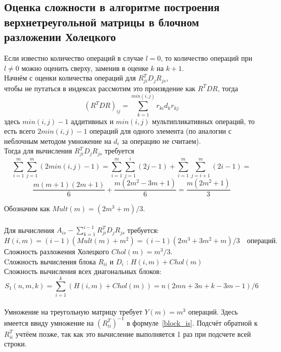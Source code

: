 \documentclass[a4paper,12pt]{article}
\begin{document}
    
\newpage
\subsection{Оценка сложности в алгоритме построения верхнетреугольной 
матрицы в блочном разложении Холецкого}
    Если известно количество операций в случае $l = 0$, то количество 
    операций при $l \neq 0$ можно оценить сверху, заменив в оценке $k$ на $k + 1$.  \\
    
    Начнём с оценки количества операций для $R_{ji}^T D_j R_{js}$,\\
    чтобы не путаться в индексах рассмотим это произвдение как $R^TDR$, тогда
    $$ (R^TDR)_{ij} = \sum_{k=1}^{min(i,j)} r_{ki} d_k r_{kj} $$
    здесь $min(i,j) - 1$ аддитивных и $min(i,j)$ мультипликативных операций, 
    то есть всего $2min(i,j) - 1$ операций для одного элемента 
    (по аналогии с неблочным методом умножение на $d_i$ за операцию не считаем). \\
    
    Тогда для вычисления $R_{ji}^T D_j R_{js}$ требуется 
    $$
        \sum_{i=1}^m \sum_{j=1}^m (2min(i,j) - 1) =
        \sum_{i=1}^m \sum_{j=1}^i (2j - 1) + 
        \sum_{i=1}^m \sum_{j=i+1}^m (2i - 1) = $$$$
        \frac{m(m+1)(2m+1)}6 + \frac{m(2m^2-3m+1)}6 = 
        \frac{m(2m^2+1)}3 
    $$
    
    Обозначим как $ Mult(m) = (2m^3+m)/3 $. \\ \\
    
    Для вычисления $A_{is} - \sum_{k=1}^{i-1}R_{ji}^T D_j R_{js}$ требуется: 
    $$
        H(i,m) = 
        (i-1)(Mult(m)+m^2) = 
        (i-1)(2m^3+3m^2+m)/3 
        \quad \text{операций.}
    $$  
    Сложность разложения Холецкого $Chol(m) = m^3/3$. \\
    Cложность вычисления блока $R_{ii}$ и $D_i$ : $H(i,m) + Chol(m)$ \\
    \hypertarget{block_border}{Сложность вычисления всех диагональных блоков:}
    $$ 
        S_1(n,m,k) = 
        \sum_{i=1}^k (H(i,m) + Chol(m)) =
        n(2mn + 3n + k - 3m -1)/6
    $$
    \\
    
    Умножение на треугольную матрицу требует $Y(m)=m^3$ операций.
    Здесь имеется ввиду умножение на $(R_{ii}^T)^{-1}$ в формуле~\eqref{block_is}. 
    Подсчёт обратной к $R_{ii}^T$ учтёем позже, так как это вычисление выполняется 
    1 раз при подсчете всей строки. \\
    
\end{document}
